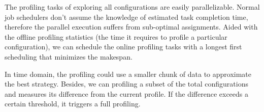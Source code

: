  The profiling tasks of exploring all
configurations are easily parallelizable. Normal job schedulers don't assume the
knowledge of estimated task completion time, therefore the parallel execution
suffers from sub-optimal assignments. Aided with the offline profiling
statistics (the time it requires to profile a particular configuration), we can
schedule the online profiling tasks with a longest first scheduling that
minimizes the makespan.

 In time domain, the profiling could use a smaller
chunk of data to approximate the best strategy. Besides, we can profiling a
subset of the total configurations and measures its difference from the current
profile. If the difference exceeds a certain threshold, it triggers a full
profiling.




